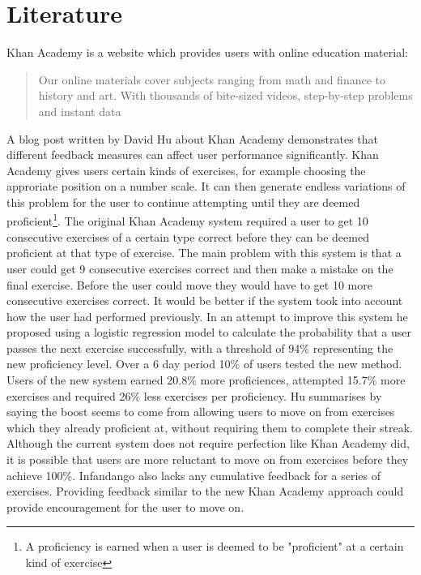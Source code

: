 \section{Literature}
Khan Academy\cite{khan_site} is a website which provides users with online education material:
\begin{quote}
Our online materials cover subjects ranging from math and finance to history and art.  With thousands of bite-sized videos, step-by-step problems and instant data\cite{ka_faq}
\end{quote}


A blog post\cite{khan_blog} written by David Hu about Khan Academy demonstrates that different feedback measures can affect user performance significantly. Khan Academy gives users certain kinds of exercises, for example choosing the approriate position on a number scale. It can then generate endless variations of this problem for the user to continue attempting until they are deemed proficient\footnote{
A proficiency is earned when a user is deemed to be "proficient" at a certain kind of exercise
}. The original Khan Academy system required a user to get 10 consecutive exercises of a certain type correct before they can be deemed proficient at that type of exercise. 
The main problem with this system is that a user could get 9 consecutive exercises correct and then make a mistake on the final exercise. Before the user could move they would have to get 10 more consecutive exercises correct. It would be better if the system took into account how the user had performed previously. 
In an attempt to improve this system he proposed using a logistic regression model to calculate the probability that a user passes the next exercise successfully, with a threshold of 94\% representing the new proficiency level. Over a 6 day period 10\% of users tested the new method. Users of the new system earned 20.8\% more proficiences, attempted 15.7\% more exercises and required 26\% less exercises per proficiency. Hu summarises by saying the boost seems to come from allowing users to move on from exercises which they already proficient at, without requiring them to complete their streak.
Although the current system does not require perfection like Khan Academy did, it is possible that users are more reluctant to move on from exercises before they achieve 100\%. Infandango also lacks any cumulative feedback for a series of exercises. Providing feedback similar to the new Khan Academy approach could provide encouragement for the user to move on.

